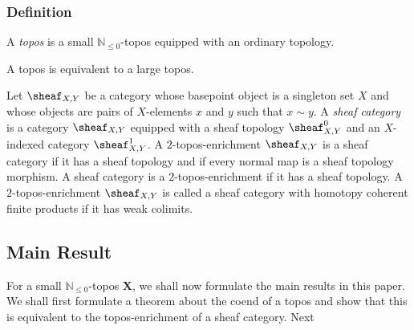 \documentclass[a4paper,reqno,oneside]{article}
\begin{document}
\subsubsection*{Definition}

\begin{definition}[Topos]
A \textit{topos} is a small $\mathbb{N}_{\leq0}$-topos equipped with an ordinary topology. 
\end{definition}

\begin{remark}
A topos is equivalent to a large topos.
\end{remark}

\begin{definition}\label{def:SheafCat}
Let $\sheaf_{X,Y}$ be a category whose basepoint object is a singleton set $X$ and whose objects are pairs of $X$-elements $x$ and $y$ such that $x\sim y$. A \textit{sheaf category} is a category $\sheaf_{X,Y}$ equipped with a sheaf topology $\sheaf_{X,Y}^0$ and an $X$-indexed category $\sheaf_{X,Y}^1$. A $2$-topos-enrichment $\sheaf_{X,Y}$ is a sheaf category if it has a sheaf topology and if every normal map is a sheaf topology morphism. A sheaf category is a $2$-topos-enrichment if it has a sheaf topology. A $2$-topos-enrichment $\sheaf_{X,Y}$ is called a sheaf category with homotopy coherent finite products if it has weak colimits. 
\end{definition}



\subsection*{Main Result}

For a small $\mathbb{N}_{\leq0}$-topos $\mathbf{X}$, we shall now formulate the main results in this paper. We shall first formulate a theorem about the coend of a topos and show that this is equivalent to the topos-enrichment of a sheaf category. Next
\end{document}
